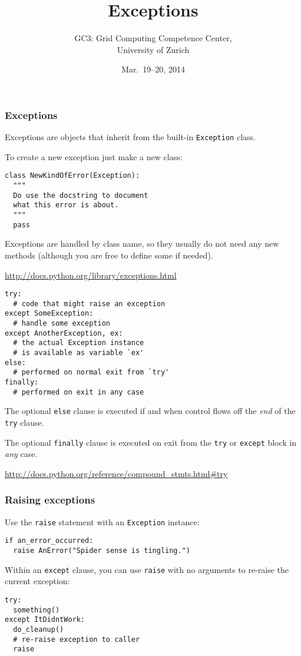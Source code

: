 \documentclass[english,serif,mathserif,xcolor=pdftex,dvipsnames,table]{beamer}
\title[Part 7]{%
  Exceptions
}
\author[GC3]{%
  GC3: Grid Computing Competence Center, \\
  University of Zurich
}
\date{Mar.~19--20, 2014}
\begin{document}
\maketitle


\begin{frame}[fragile]
  \frametitle{Exceptions}

  Exceptions are objects that inherit from the built-in
  \lstinline|Exception| class.

  \+
  To create a new exception just make a new class:
\begin{lstlisting}
class NewKindOfError(Exception):
  """
  Do use the docstring to document
  what this error is about.
  """
  pass
\end{lstlisting}

  \+
  Exceptions are handled by class name, so they usually do not need
  any new methods (although you are free to define some if needed).

  \begin{seealso}
    \url{http://docs.python.org/library/exceptions.html}
  \end{seealso}
\end{frame}


\begin{frame}[fragile]
\begin{lstlisting}
try:
  # code that might raise an exception
except SomeException:
  # handle some exception
except AnotherException, ex:
  # the actual Exception instance
  # is available as variable `ex'
else:
  # performed on normal exit from `try'
finally:
  # performed on exit in any case
\end{lstlisting}

  \+
  The optional \lstinline|else| clause is executed if and when control flows off the
  \emph{end} of the \lstinline|try| clause.

  \+
  The optional \lstinline|finally| clause is executed on exit from the
  \lstinline|try| or \lstinline|except| block in \emph{any} case.

  \begin{references}
    \scriptsize
    \url{http://docs.python.org/reference/compound_stmts.html#try}
\end{references}
\end{frame}


\begin{frame}[fragile]
  \frametitle{Raising exceptions}

  Use the \lstinline|raise| statement with an \texttt{Exception}
  instance:
\begin{lstlisting}
if an_error_occurred:
  raise AnError("Spider sense is tingling.")
\end{lstlisting}

  \+
  Within an \lstinline|except| clause, you can use \lstinline|raise|
  with no arguments to re-raise the current exception:
\begin{lstlisting}
try:
  something()
except ItDidntWork:
  do_cleanup()
  # re-raise exception to caller
  raise
\end{lstlisting}
\end{frame}
\end{document}
